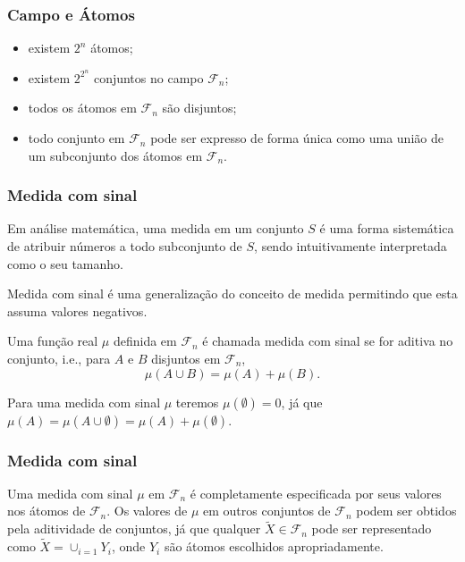 \begin{frame}%
  \frametitle{Campo e Átomos}
  \begin{itemize}
  \item existem $2^n$ átomos;
  \item existem $2^{2^n}$ conjuntos no campo $\mathcal{F}_n$;
  \item todos os átomos em $\mathcal{F}_n$ são disjuntos;
  \item todo conjunto em $\mathcal{F}_n$ pode ser expresso de forma única como uma união de um subconjunto dos átomos em $\mathcal{F}_n$.
  \end{itemize}
\end{frame}

\begin{frame}%
  \frametitle{Medida com sinal}
  Em análise matemática, uma medida em um conjunto $S$ é uma forma sistemática de atribuir
  números a todo subconjunto de $S$, sendo intuitivamente interpretada como o seu tamanho.

  Medida com sinal é uma generalização do conceito de medida permitindo que esta assuma valores
  negativos.

  \begin{definition}
  Uma função real $\mu$ definida em $\mathcal{F}_n$ é chamada medida com sinal se
  for aditiva no conjunto, i.e., para $A$ e $B$ disjuntos em $\mathcal{F}_n$,
  \begin{equation}
  \mu(A \cup B) = \mu(A) + \mu(B) .
  \end{equation} 
  \end{definition}  
  Para uma medida com sinal $\mu$ teremos $\mu(\emptyset)=0$, já que
  $\mu(A) = \mu(A \cup \emptyset) = \mu(A) + \mu(\emptyset)$.
\end{frame}

\begin{frame}%
  \frametitle{Medida com sinal}
  Uma medida com sinal $\mu$ em $\mathcal{F}_n$ é completamente especificada
  por seus valores nos átomos de $\mathcal{F}_n$. Os valores de $\mu$ em outros
  conjuntos de $\mathcal{F}_n$ podem ser obtidos pela aditividade de conjuntos, 
  já que qualquer $\tilde{X} \in \mathcal{F}_n$ pode ser representado como
  $\tilde{X} = \cup_{i=1} Y_i$, onde $Y_i$ são átomos escolhidos apropriadamente.
\end{frame}


